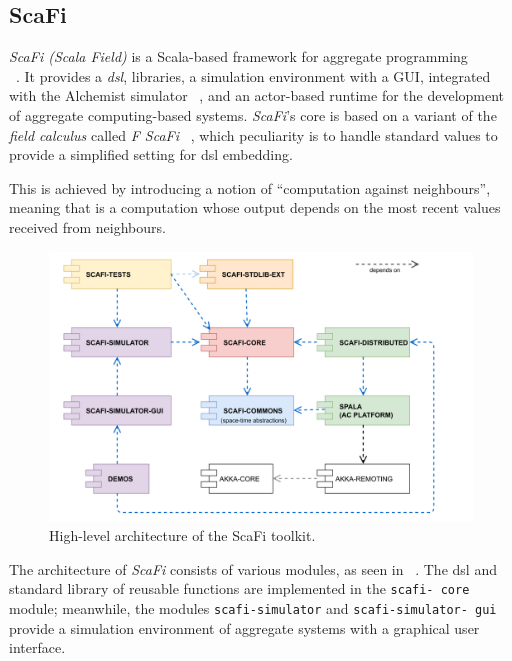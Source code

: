 \subsection{ScaFi}
\label{subsec:scafi}


\emph{ScaFi (Scala Field)} is a Scala-based framework for aggregate programming\\ ~\cite{CASADEI2022101248}.
It provides a \emph{\ac{dsl}}, libraries, a simulation environment with a GUI, integrated with the
Alchemist simulator ~\cite{10.1007/978-3-030-78198-9_10}, and an actor-based runtime for the development of aggregate computing-based systems.
\emph{ScaFi}'s core is based on a variant of the \emph{field calculus} called \emph{F ScaFi} ~\cite{10.1007/978-3-030-61470-6_21},
which peculiarity is to handle standard values to provide a simplified setting for \ac{dsl} embedding.

This is achieved by introducing a notion of ``computation against neighbours'', meaning that is a computation whose
output depends on the most recent values received from neighbours.

\begin{figure}
    \centering
    \includegraphics[width=.5\linewidth]{figures/scafi_structure}
    \caption{High-level architecture of the ScaFi toolkit.}
    \label{fig:scafi-structure}
\end{figure}

The architecture of \emph{ScaFi} consists of various modules, as seen in ~.
The \ac{dsl} and standard library of reusable functions are implemented in the \texttt{scafi-
core} module; meanwhile, the modules \texttt{scafi-simulator} and \texttt{scafi-simulator-
gui} provide a simulation
environment of aggregate systems with a graphical user interface.

